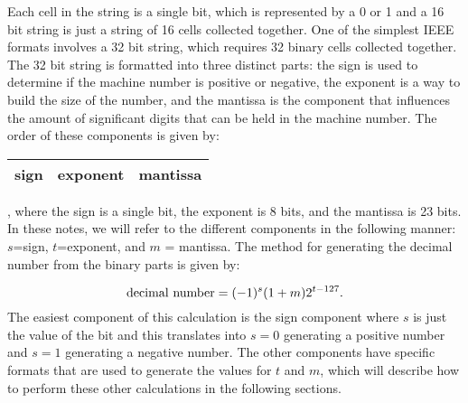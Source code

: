 \documentclass[twoside]{article}
\begin{document}
Each cell in the string is a single bit, which is represented by a 0 or 1  and a 16 bit string is just a string of 16 cells collected together. One of the simplest IEEE formats involves a 32 bit string, which requires 32 binary cells collected together. The 32 bit string is formatted into three distinct parts: the sign is used to determine if the machine number is positive or negative, the exponent is a way to build the size of the number, and the mantissa is the component that influences the amount of significant digits that can be held in the machine number. The order of these components is given by:
\begin{tabular}{|c|c|c|}
\hline
sign & exponent & mantissa\\
\hline
\end{tabular}, where the sign is a single bit, the exponent is 8 bits, and the mantissa is 23 bits. In these notes, we will refer to the different components in the following manner: $ s$=sign, $t$=exponent, and $m$ = mantissa. The method for generating the decimal number from the binary parts is given by:

\begin{equation} 
{\rm decimal \ number}=(-1)^s(1+m)2^{t-127}.
\label{e:decimal_number}
\end{equation}
The easiest component of this calculation is the sign component where $s$ is just  the value of the bit and this translates into $s=0$ generating a positive number and $s=1$ generating a negative number. The other components have specific formats that are used to generate the values for $t$ and $m$, which will describe how to perform these other calculations in the following sections. 
\end{document}
